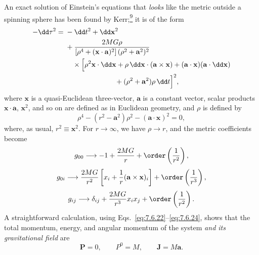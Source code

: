 An exact solution of Einstein's equations that \emph{looks} like the metric
outside a spinning sphere has been found by
Kerr;\hyperref[ch9-ref-9]{\textsuperscript{9}} it is of the form
\[
  \begin{split}
  -\dd\tau^2={}&-\dd t^2+\dd\mathbf x^2\\
  &+\frac{2MG\rho}
  {\left[\rho^4+(\mathbf x\cdot\mathbf a)^2\right]
   (\rho^2+\mathbf a^2)^2}\\
  &\quad\times
  \Bigl[
    \rho^2\mathbf x\cdot\dd\mathbf x
    +\rho\,\dd\mathbf x\cdot(\mathbf a\times\mathbf x)
    +(\mathbf a\cdot\mathbf x)(\mathbf a\cdot\dd\mathbf x)\\
  &\hspace{7em}
    +(\rho^2+\mathbf a^2)\rho\,\dd t
  \Bigr]^2,
  \end{split}
\]
where \(\mathbf x\) is a quasi-Euclidean three-vector, \(\mathbf a\) is a
constant vector, scalar products \(\mathbf x\cdot\mathbf a\),
\(\mathbf x^2\), and so on are defined as in Euclidean geometry, and
\(\rho\) is defined by
\[
  \rho^4-(r^2-\mathbf a^2)\rho^2
  -(\mathbf a\cdot\mathbf x)^2=0,
\]
where, as usual, \(r^2\equiv\mathbf x^2\). For \(r\to\infty\), we have
\(\rho\to r\), and the metric coefficients become
\[
  g_{00}\longrightarrow
  -1+\frac{2MG}{r}+\order\left(\frac1{r^2}\right),
\]
\[
  g_{0i}\longrightarrow
  \frac{2MG}{r^2}
  \left[
    x_i+\frac1r(\mathbf a\times\mathbf x)_i
  \right]
  +\order\left(\frac1{r^3}\right),
\]
\[
  g_{ij}\longrightarrow
  \delta_{ij}+\frac{2MG}{r^3}x_ix_j
  +\order\left(\frac1{r^2}\right).
\]
A straightforward calculation, using
Eqs.~\eqref{eq:7.6.22}--\eqref{eq:7.6.24}, shows that the total momentum,
energy, and angular momentum of the system \emph{and its gravitational
field} are
\[
  \mathbf P=0,
  \qquad
  P^0=M,
  \qquad
  \mathbf J=M\mathbf a.
\]

